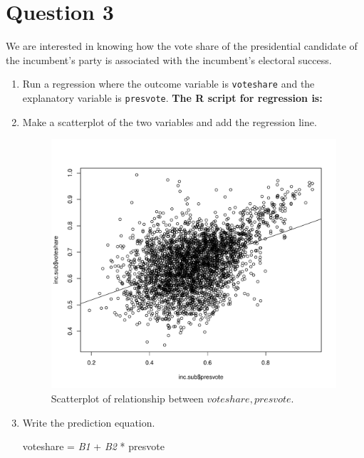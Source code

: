 \documentclass[12pt,letterpaper]{article}
\begin{document}
	\newpage	
	
\section*{Question 3}

\noindent We are interested in knowing how the vote share of the presidential candidate of the incumbent's party is associated with the incumbent's electoral success.
	\vspace{.25cm}
	\begin{enumerate}
		\item Run a regression where the outcome variable is \texttt{voteshare} and the explanatory variable is \texttt{presvote}.
			\textbf{		The R script for regression is:}
		  
		

			
			
		\item Make a scatterplot of the two variables and add the regression line. 
			
			
			 
				\begin{figure}[h!]\centering	\caption{\footnotesize Scatterplot of relationship between $voteshare, presvote$.}	
				
				\includegraphics[width=.7\textwidth]{plot3.pdf}
				
			\end{figure}
			
		\item Write the prediction equation.
		
		voteshare = \textit{B1} + \textit{B2} * presvote
		
		
		
		
		
		
	\end{enumerate}
	
\end{document}
